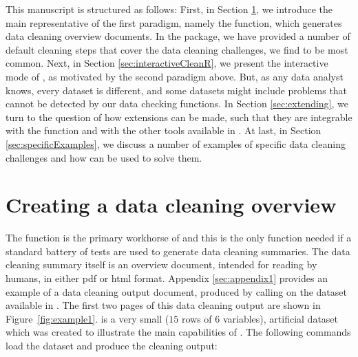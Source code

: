 \documentclass[article,shortnames]{jss}
\newcommand{\hl}[1]{\textcolor{magenta}{#1}}
\newcommand{\R}[1]{\code{#1}}
\begin{document}
This manuscript is structured as follows: First, in Section
\ref{sec:usingcleanR}, we introduce the main representative of the first
paradigm, namely the \R{clean()} function, which generates data
cleaning overview documents. In the  package, we have
provided a number of default cleaning steps that cover the data
cleaning challenges, we find to be most common. Next, in Section
\ref{sec:interactiveCleanR}, we present the interactive mode of , as motivated
by the second paradigm above. But, as any data analyst knows,
every dataset is different, and some datasets might include problems
that cannot be detected by our data checking functions. In Section
\ref{sec:extending}, we turn to the question of how  extensions
can be made, such that they are integrable with the \R{clean()}
function and with the other tools available in .  At last,
in Section \ref{sec:specificExamples}, we discuss a number of examples of
specific data cleaning challenges and how  can be used to
solve them.


 



\section{Creating a data cleaning overview} 
\label{sec:usingcleanR}

The \R{clean()} function is the primary workhorse of  and
this is the only function needed if a standard battery
of tests are used to generate data cleaning summaries. The data
cleaning summary itself is an overview document, intended for reading
by humans, in either pdf or html format. Appendix \ref{sec:appendix1}
provides an example of a data cleaning output document, produced by
calling \R{clean()} on the dataset \R{toyData} available in
. The first two pages of this data cleaning output are
shown in Figure~\ref{fig:example1}. \R{toyData} is a very
small ($15$ rows of $6$ variables), artificial dataset which was created to
illustrate the main capabilities of . The following
commands load the dataset and produce the cleaning output:
\end{document}
